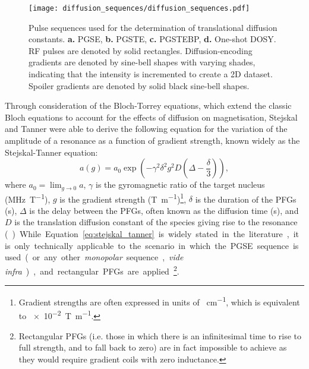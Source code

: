 \begin{figure}
   \texttt{[image: diffusion\_sequences/diffusion\_sequences.pdf]}
   \caption[
       Pulse sequences used for the determination of translational diffusion constants.
   ]{
       Pulse sequences used for the determination of translational diffusion constants.
       \textbf{a.} \acs{PGSE},
       \textbf{b.} \acs{PGSTE},
       \textbf{c.} \acs{PGSTEBP},
       \textbf{d.} One-shot DOSY.
       \ac{RF} pulses are denoted by solid rectangles. Diffusion-encoding
       gradients are denoted by sine-bell shapes with varying shades,
       indicating that the intensity is incremented to create a \ac{2D}
       dataset. Spoiler gradients are denoted by solid black sine-bell shapes.
   }
   \label{fig:diffusion_sequences}
\end{figure}

Through consideration of the Bloch-Torrey equations\cite{Torrey1956}, which
extend the classic Bloch equations to account for the effects of diffusion on
magnetisation, Stejskal and Tanner were able to derive the following equation
for the variation of the amplitude of a resonance as a function of gradient
strength, known widely as the Stejskal-Tanner equation:
\begin{equation}
    a(g) = a_0 \exp \left(- \gamma^2 \delta^2 g^2 D \left(\Delta -
    \frac{\delta}{3}\right)\right),
    \label{eq:stejskal_tanner}
\end{equation}
where
$a_0 = \lim_{g \rightarrow 0} a$,
$\gamma$ is the gyromagnetic ratio of the target nucleus
(\unit{\mega\hertz\per\tesla}),
$g$ is the gradient strength (\unit{\tesla\per\meter})\footnote{
    Gradient strengths are often expressed in units of
    \unit{\gauss\per\centi\meter}, which is equivalent to
    \qty[print-unity-mantissa = false]{e-2}{\tesla\per\meter}.
},
$\delta$ is the duration of the \acp{PFG} (\unit{\second}),
$\Delta$ is the delay between the \acp{PFG}, often known as the diffusion time
(\unit{\second}),
and $D$ is the translation diffusion constant of the species giving rise to the
resonance (\unit{\meter\square\per\second}).
While Equation \ref{eq:stejskal_tanner} is widely stated in the literature, it
is only technically applicable to the scenario in which the \ac{PGSE} sequence
is used (or any other \emph{monopolar} sequence, \emph{vide infra}), and
rectangular \acp{PFG} are applied
\footnote{
    Rectangular \acp{PFG} (i.e. those in which there is an infinitesimal time
    to rise to full strength, and to fall back to zero) are in fact
    impossible to achieve as they would require gradient coils with zero
    inductance.
}.

